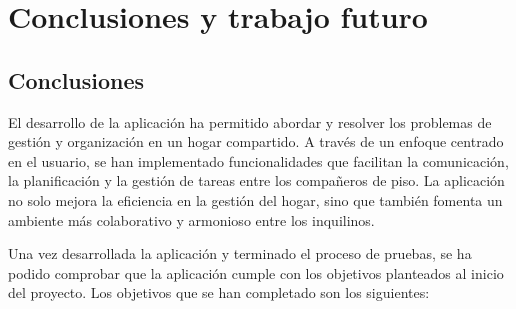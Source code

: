\chapter{Conclusiones y trabajo futuro}
\label{cap:conclusiones}

\section{Conclusiones}

El desarrollo de la aplicación ha permitido abordar y resolver los problemas de gestión y organización en un hogar compartido. A través de un enfoque centrado en el usuario, se han implementado funcionalidades que facilitan la comunicación, 
la planificación y la gestión de tareas entre los compañeros de piso. La aplicación no solo mejora la eficiencia en la gestión del hogar, sino que también fomenta un ambiente más colaborativo y armonioso entre los inquilinos.

Una vez desarrollada la aplicación y terminado el proceso de pruebas, se ha podido comprobar que la aplicación cumple con los 
objetivos planteados al inicio del proyecto. Los objetivos que se han completado son los siguientes: 

